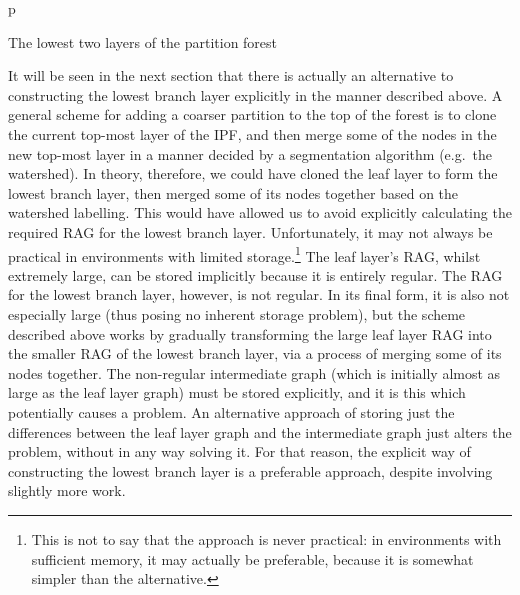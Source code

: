 \begin{stusubfig}{p}
	\hspace{12mm}%
\caption{The lowest two layers of the partition forest}
\label{fig:segmentation-ipfconstruction-lowestbranchlayer}
\end{stusubfig}

It will be seen in the next section that there is actually an alternative to constructing the lowest branch layer explicitly in the manner described above. A general scheme for adding a coarser partition to the top of the forest is to clone the current top-most layer of the IPF, and then merge some of the nodes in the new top-most layer in a manner decided by a segmentation algorithm (e.g.~the watershed). In theory, therefore, we could have cloned the leaf layer to form the lowest branch layer, then merged some of its nodes together based on the watershed labelling. This would have allowed us to avoid explicitly calculating the required RAG for the lowest branch layer. Unfortunately, it may not always be practical in environments with limited storage.\footnote{This is not to say that the approach is never practical: in environments with sufficient memory, it may actually be preferable, because it is somewhat simpler than the alternative.} The leaf layer's RAG, whilst extremely large, can be stored implicitly because it is entirely regular. The RAG for the lowest branch layer, however, is not regular. In its final form, it is also not especially large (thus posing no inherent storage problem), but the scheme described above works by gradually transforming the large leaf layer RAG into the smaller RAG of the lowest branch layer, via a process of merging some of its nodes together. The non-regular intermediate graph (which is initially almost as large as the leaf layer graph) must be stored explicitly, and it is this which potentially causes a problem. An alternative approach of storing just the differences between the leaf layer graph and the intermediate graph just alters the problem, without in any way solving it. For that reason, the explicit way of constructing the lowest branch layer is a preferable approach, despite involving slightly more work.

